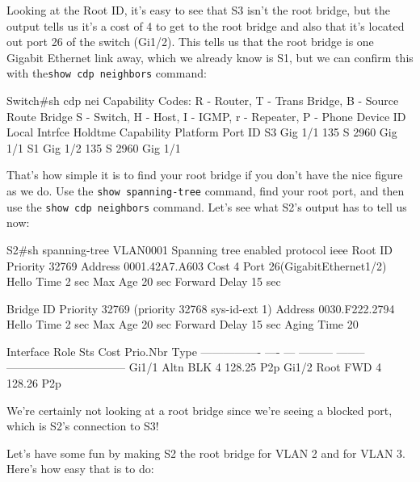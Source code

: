 Looking at the Root ID, it's easy to see that S3 isn't the root bridge,
but the output tells us it's a cost of 4 to get to the root bridge and
also that it's located out port 26 of the switch (Gi1/2). This tells us
that the root bridge is one Gigabit Ethernet link away,
which we already know
is S1, but we can confirm this with the\texttt{show\ cdp\ neighbors}
command:

\begin{cli}
Switch#sh cdp nei
Capability Codes: R - Router, T - Trans Bridge, B - Source Route Bridge
                  S - Switch, H - Host, I - IGMP, r - Repeater, P - Phone
Device ID    Local Intrfce   Holdtme    Capability   Platform    Port ID
S3           Gig 1/1          135            S       2960        Gig 1/1
S1           Gig 1/2          135            S       2960        Gig 1/1
\end{cli}

That's how simple it is to find your root bridge if you don't have the
nice figure as we do. Use the \texttt{show\ spanning-tree} command, find
your root port, and then use the \texttt{show\ cdp\ neighbors} command.
Let's see what S2's output has to tell us now:

\begin{cli}
S2#sh spanning-tree
VLAN0001
  Spanning tree enabled protocol ieee
  Root ID    Priority    32769
             Address     0001.42A7.A603
             Cost        4
             Port        26(GigabitEthernet1/2)
             Hello Time  2 sec  Max Age 20 sec  Forward Delay 15 sec
 
  Bridge ID  Priority    32769  (priority 32768 sys-id-ext 1)
             Address     0030.F222.2794
             Hello Time  2 sec  Max Age 20 sec  Forward Delay 15 sec
             Aging Time  20
 
Interface        Role Sts Cost      Prio.Nbr Type
---------------- ---- --- --------- -------- --------------------------------
Gi1/1            Altn BLK 4         128.25   P2p
Gi1/2            Root FWD 4         128.26   P2p
\end{cli}

We're certainly not looking at a root bridge since we're seeing a
blocked port, which is S2's connection to S3!

Let's have some fun by making S2 the root bridge for VLAN 2 and for VLAN
3. Here's how easy that is to do:

